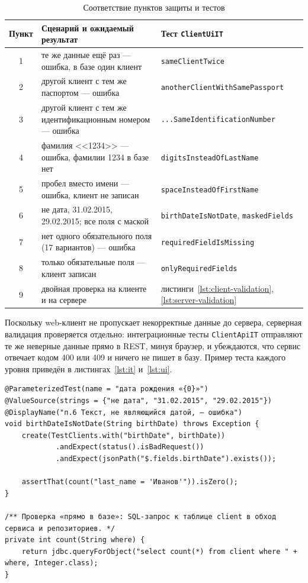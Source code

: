 \documentclass[14pt,a4paper]{extarticle}
\begin{document}
\begin{table}[H]
\caption{Соответствие пунктов защиты и тестов}
\label{tab:defense}
\centering
\small
\begin{tabularx}{\textwidth}{cXl}
\toprule
Пункт & Сценарий и ожидаемый результат & Тест \texttt{ClientUiIT} \\
\midrule
1 & те же данные ещё раз --- ошибка, в базе один клиент & \texttt{sameClientTwice} \\
2 & другой клиент с тем же паспортом --- ошибка & \texttt{anotherClientWithSamePassport} \\
3 & другой клиент с тем же идентификационным номером --- ошибка & \texttt{...SameIdentificationNumber} \\
4 & фамилия <<1234>> --- ошибка, фамилии 1234 в базе нет & \texttt{digitsInsteadOfLastName} \\
5 & пробел вместо имени --- ошибка, клиент не записан & \texttt{spaceInsteadOfFirstName} \\
6 & не дата, 31.02.2015, 29.02.2015; все поля с маской & \texttt{birthDateIsNotDate}, \texttt{maskedFields} \\
7 & нет одного обязательного поля (17 вариантов) --- ошибка & \texttt{requiredFieldIsMissing} \\
8 & только обязательные поля --- клиент записан & \texttt{onlyRequiredFields} \\
9 & двойная проверка на клиенте и на сервере & листинги~\ref{lst:client-validation}, \ref{lst:server-validation} \\
\bottomrule
\end{tabularx}
\end{table}

Поскольку web-клиент не пропускает некорректные данные до сервера, серверная валидация
проверяется отдельно: интеграционные тесты \texttt{ClientApiIT} отправляют те же неверные
данные прямо в REST, минуя браузер, и убеждаются, что сервис отвечает кодом 400 или 409 и
ничего не пишет в базу. Пример теста каждого уровня приведён в листингах~\ref{lst:it}
и~\ref{lst:ui}.

\begin{lstlisting}[style=java, caption={Интеграционный тест пункта 6 (\texttt{ClientApiIT})}, label={lst:it}]
@ParameterizedTest(name = "дата рождения «{0}»")
@ValueSource(strings = {"не дата", "31.02.2015", "29.02.2015"})
@DisplayName("п.6 Текст, не являющийся датой, — ошибка")
void birthDateIsNotDate(String birthDate) throws Exception {
    create(TestClients.with("birthDate", birthDate))
            .andExpect(status().isBadRequest())
            .andExpect(jsonPath("$.fields.birthDate").exists());

    assertThat(count("last_name = 'Иванов'")).isZero();
}

/** Проверка «прямо в базе»: SQL-запрос к таблице client в обход сервиса и репозиториев. */
private int count(String where) {
    return jdbc.queryForObject("select count(*) from client where " + where, Integer.class);
}
\end{lstlisting}
\end{document}
